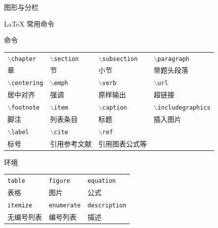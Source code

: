 \documentclass{beamer}
\def\cmd#1{\texttt{\color{red}\footnotesize $\backslash$#1}}
\def\env#1{\texttt{\color{blue}\footnotesize #1}}
\begin{document}
\begin{frame}{图形与分栏}
\begin{minipage}{0.5\linewidth}
\begin{figure}[h]
        \end{figure}
    \end{minipage}
\end{frame}




\begin{frame}[fragile]{\LaTeX{} 常用命令}
    \begin{textbox}{命令}
        \centering
        \footnotesize
        \begin{tabular}{llll}
            \cmd{chapter}   & \cmd{section} & \cmd{subsection} & \cmd{paragraph}       \\
            章              & 节            & 小节             & 带题头段落            \\\hline
            \cmd{centering} & \cmd{emph}    & \cmd{verb}       & \cmd{url}             \\
            居中对齐        & 强调          & 原样输出         & 超链接                \\\hline
            \cmd{footnote}  & \cmd{item}    & \cmd{caption}    & \cmd{includegraphics} \\
            脚注            & 列表条目      & 标题             & 插入图片              \\\hline
            \cmd{label}     & \cmd{cite}    & \cmd{ref}                                \\
            标号            & 引用参考文献  & 引用图表公式等                           \\\hline
        \end{tabular}
    \end{textbox}
    \begin{textbox}{环境}
        \centering
        \footnotesize
        \begin{tabular}{lll}
            \env{table}   & \env{figure}    & \env{equation}    \\
            表格          & 图片            & 公式              \\\hline
            \env{itemize} & \env{enumerate} & \env{description} \\
            无编号列表    & 编号列表        & 描述              \\\hline
        \end{tabular}
    \end{textbox}
\end{frame}
\end{document}

